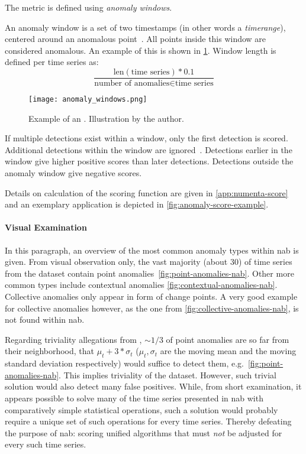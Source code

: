 The metric is defined using \textit{anomaly windows}.
\begin{definition}\label{def:anomaly-window}
    An anomaly window is a set of two timestamps (in other words a \textit{timerange}),
    centered around an anomalous point~\cite[cf.][]{Lavin.2015}. All points inside
    this window are considered anomalous. An example of this is shown in \cref{fig:anomaly-window}.
    Window length is defined per time series as:
    \[\frac{\text{len}(\text{time series}) * 0.1}{\text{number of anomalies}\in \text{time series}}\]
    \begin{figure}[htp!]
        \centering
        \texttt{[image: anomaly\_windows.png]}
        \caption[Example of an .]{Example of an . Illustration
        by the author.}\label{fig:anomaly-window}
    \end{figure}
\end{definition}
If multiple detections exist within a window, only the first detection is scored.
Additional detections within the window are ignored~\cite[cf.][]{Lavin.2015}.
Detections earlier in the window give higher positive scores than later detections.
Detections outside the anomaly window give negative scores.

Details on calculation of the scoring function are given in \cref{app:numenta-score}
and an exemplary application is depicted in \cref{fig:anomaly-score-example}.


\paragraph{Visual Examination}
In this paragraph, an overview of the most common anomaly types within \gls{nab}
is given. From visual observation only, the vast majority (about 30) of time
series from the dataset contain point anomalies~\cref{fig:point-anomalies-nab}.
Other more common types include contextual anomalies \cref{fig:contextual-anomalies-nab}.
Collective anomalies only appear in form of change points. A very good example
for collective anomalies however, as the one from \cref{fig:collective-anomalies-nab},
is not found within \gls{nab}.

Regarding triviality allegations from \textcite{Lavin.2015}, \(\sim 1/3\) of
point anomalies are so far from their neighborhood, that \(\mu_t + 3*\sigma_t\)
(\(\mu_t, \sigma_t\) are the moving mean and the moving standard deviation
respectively) would suffice to detect them, e.g.\ \cref{fig:point-anomalies-nab}.
This implies triviality of the dataset. However, such trivial solution would
also detect many false positives. While, from short examination, it appears possible
to solve many of the time series presented in \gls{nab} with comparatively simple
statistical operations, such a solution would probably require a unique set of such
operations for every time series. Thereby defeating the purpose of \gls{nab}:
scoring unified algorithms that must \textit{not} be adjusted for every such
time series.

